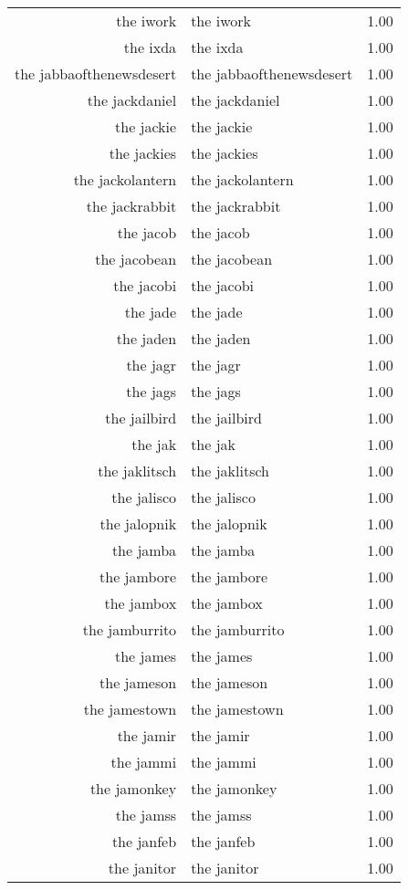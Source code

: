 \begin{table}[ht]
\begin{tabular}{rlr}
  the iwork & the iwork & 1.00 \\ 
  the ixda & the ixda & 1.00 \\ 
  the jabbaofthenewsdesert & the jabbaofthenewsdesert & 1.00 \\ 
  the jackdaniel & the jackdaniel & 1.00 \\ 
  the jackie & the jackie & 1.00 \\ 
  the jackies & the jackies & 1.00 \\ 
  the jackolantern & the jackolantern & 1.00 \\ 
  the jackrabbit & the jackrabbit & 1.00 \\ 
  the jacob & the jacob & 1.00 \\ 
  the jacobean & the jacobean & 1.00 \\ 
  the jacobi & the jacobi & 1.00 \\ 
  the jade & the jade & 1.00 \\ 
  the jaden & the jaden & 1.00 \\ 
  the jagr & the jagr & 1.00 \\ 
  the jags & the jags & 1.00 \\ 
  the jailbird & the jailbird & 1.00 \\ 
  the jak & the jak & 1.00 \\ 
  the jaklitsch & the jaklitsch & 1.00 \\ 
  the jalisco & the jalisco & 1.00 \\ 
  the jalopnik & the jalopnik & 1.00 \\ 
  the jamba & the jamba & 1.00 \\ 
  the jambore & the jambore & 1.00 \\ 
  the jambox & the jambox & 1.00 \\ 
  the jamburrito & the jamburrito & 1.00 \\ 
  the james & the james & 1.00 \\ 
  the jameson & the jameson & 1.00 \\ 
  the jamestown & the jamestown & 1.00 \\ 
  the jamir & the jamir & 1.00 \\ 
  the jammi & the jammi & 1.00 \\ 
  the jamonkey & the jamonkey & 1.00 \\ 
  the jamss & the jamss & 1.00 \\ 
  the janfeb & the janfeb & 1.00 \\ 
  the janitor & the janitor & 1.00 \\ 

\end{tabular}
\end{table}
